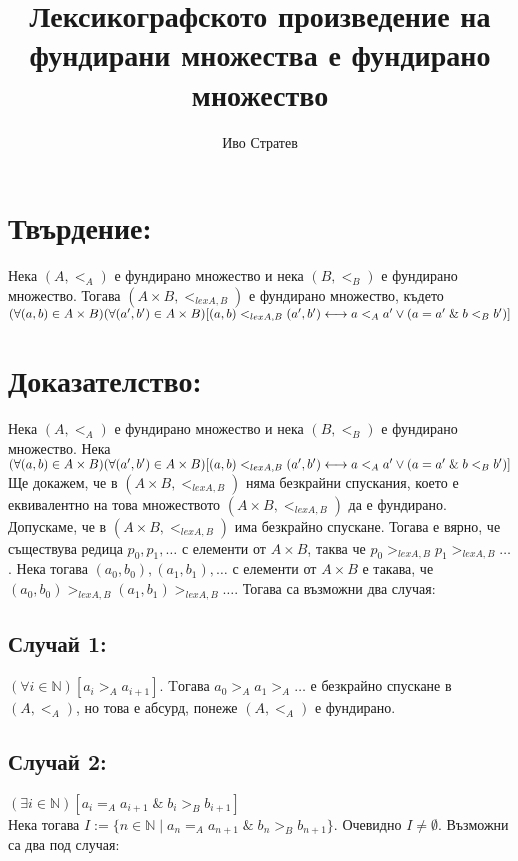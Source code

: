 \documentclass[a4paper, 12pt, oneside]{article}
\title{Лексикографското произведение на фундирани множества е фундирано множество}
\author{Иво Стратев}
\begin{document}
\maketitle
\section*{Твърдение:}
Нека \((A, <_A)\) е фундирано множество и нека \((B, <_B)\) е фундирано множество.
Тогава \((A \times B, <_{lex A, B})\) е фундирано множество, където \\
\((\forall (a, b) \in A \times B)(\forall (a', b') \in A \times B)[(a, b) <_{lex A, B} (a', b') \longleftrightarrow \\
a <_A a' \lor (a = a' \; \& \; b <_B b')]\)
\section*{Доказателство:} 
Нека \((A, <_A)\) е фундирано множество и нека \((B, <_B)\) е фундирано множество.
Нека \((\forall (a, b) \in A \times B)(\forall (a', b') \in A \times B)[(a, b) <_{lex A, B} (a', b') \longleftrightarrow \\
a <_A a' \lor (a = a' \; \& \; b <_B b')]\) \\
Ще докажем, че в \((A \times B, <_{lex A, B})\) няма безкрайни спускания,
което е еквивалентно на това множеството \((A \times B, <_{lex A, B})\) да е фундирано. \\
Допускаме, че в \((A \times B, <_{lex A, B})\) има безкрайно спускане. Тогава е вярно,
че съществува редица \(p_0, p_1, \dots\) с елементи от \(A \times B\), таква че \(p_0 >_{lex A, B} p_1  >_{lex A, B} \dots\).
Нека тогава \((a_0, b_0), (a_1, b_1), \dots\) с елементи от \(A \times B\) е такава, че \((a_0, b_0) >_{lex A, B} (a_1, b_1) >_{lex A, B} \dots\).
Тогава са възможни два случая:
\subsection*{Случай 1:}
\((\forall i \in \mathbb{N})[a_i >_A a_{i + 1}]\). Tогава \(a_0 >_A a_1 >_A \dots\) е безкрайно спускане в \((A, <_A)\),
но това е абсурд, понеже \((A, <_A)\) е фундирано.
\subsection*{Случай 2:}
\((\exists i \in \mathbb{N})[a_i =_A a_{i + 1} \; \& \; b_i >_B b_{i + 1}]\) \\
Нека тогава \(I := \{n \in \mathbb{N} \; | \; a_n =_A a_{n + 1} \; \& \; b_n >_B b_{n + 1}\}\). 
Очевидно \(I \neq \emptyset\).
Възможни са два под случая: \\
\end{document}
